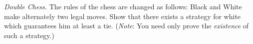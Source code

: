 \emph{Double Chess.} The rules of the chess are changed as follows: Black and White make alternately two legal moves. Show that there exists a strategy for white which guarantees him at least a tie. (\emph{Note}: You need only prove the \emph{existence} of such a strategy.)
